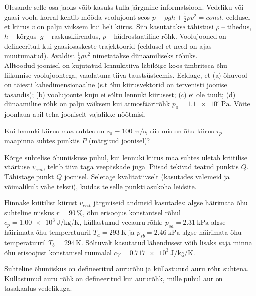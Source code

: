 \documentclass[a4paper,11pt,twocolumn]{article}
\begin{document}
\begin{question}[IPhO 2012, T1B][ter2][\columnwidth]
	Ülesande selle osa jaoks võib kasuks tulla järgmine informatsioon. Vedeliku või gaasi voolu korral kehtib mööda voolujoont seos \( p+\rho g h+\frac{1}{2}\rho v^2=const \), eeldusel et kiirus \( v \) on palju väiksem kui heli kiirus. Siin kasutatakse tähistusi \( \rho \) -- tihedus, \( h \) -- kõrgus, \( g \) -- raskuskiirendus, \( p \) -- hüdrostaatiline rõhk. Voolujooned on defineeritud kui gaasiosaskeste trajektoorid (eeldusel et need on ajas muutumatud). Avaldist \( \frac{1}{2}\rho v^2 \) nimetatakse dünaamiliseks rõhuks.\\
	Alltoodud joonisel on kujutatud lennukitiiva läbilõige koos ümbritsea õhu liikumise voolujoontega, vaadatuna tiiva taustsüsteemis. Eeldage, et (a) õhuvool on täiesti kahedimensionaalne (s.t õhu kiirusvektorid on tervenisti joonise tasandis); (b) voolujoonte kuju ei sõltu lennuki kiirusest; (c) ei ole tuult; (d) dünaamiline rõhk on palju väiksem kui atmosfäärirõhk \( p_0=\SI{1,1e5}{\Pa} \). Võite joonlaua abil teha jooniselt vajalikke nõõtmisi.
	\begin{subquestion}
		\item Kui lennuki kiirus maa suhtes on \( v_0=\SI{100}{\m\per\s} \), siis mis on õhu kiirus \( v_p \) maapinna suhtes punktis \( P \) (märgitud joonisel)?
		\item Kõrge suhtelise õhuniiskuse puhul, kui lennuki kiirus maa suhtes uletab kriitilise väärtuse \( v_{crit} \), tekib tiiva taga veepiiskade juga. Piisad tekivad teatud punktis \( Q \). Tähistage punkt \( Q \) joonisel. Seletage kvalitatiivselt (kasutades valemeid ja võimalikult vähe teksti), kuidas te selle punkti asukoha leidsite.
		\item Hinnake kriitilist kiirust \( v_{crit} \) järgmiseid andmeid kasutades: algse häirimata õhu suhteline niiskus \( r=\SI{90}{\percent} \), õhu erisoojus konstantsel rõhul \( c_p=\SI{1,00e3}{\J\per\kg\per\K} \), küllastunud veeauru rõhk: \( p_{sa}=\SI{2,31}{\kPa} \) algse häirimata õhu temperatuuril \( T_a=\SI{293}{\K} \) ja \( p_{sb}=\SI{2,46}{\kPa} \) algse häirimata õhu temperatuuril \( T_b=\SI{294}{\K} \). Sõltuvalt kasutatud lähendusest võib lisaks vaja minna õhu erisoojust konstantsel ruumalal \( c_V=\SI{0,717e3}{\J\per\kg\per\K} \). \hfill
	\end{subquestion}
	\setlength{\parskip}{0em}
	Suhteline õhuniiskus on defineeritud aururõhu ja küllastunud auru rõhu suhtena. Küllastunud auru rõhk on defineeritud kui aururõhk, mille puhul aur on tasakaalus vedelikuga.
	\setlength{\parskip}{1em}
\end{question}
\end{document}

